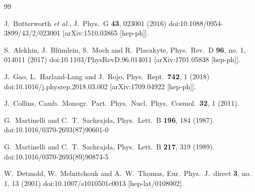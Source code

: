 %
%

\begin{thebibliography}{99}

  J.~Butterworth {\it et al.},
  J.\ Phys.\ G {\bf 43}, 023001 (2016)
  doi:10.1088/0954-3899/43/2/023001
  [arXiv:1510.03865 [hep-ph]].


  S.~Alekhin, J.~Bl\"umlein, S.~Moch and R.~Placakyte,
  Phys.\ Rev.\ D {\bf 96}, no. 1, 014011 (2017)
  doi:10.1103/PhysRevD.96.014011
  [arXiv:1701.05838 [hep-ph]].


  J.~Gao, L.~Harland-Lang and J.~Rojo,
  Phys.\ Rept.\  {\bf 742}, 1 (2018)
  doi:10.1016/j.physrep.2018.03.002
  [arXiv:1709.04922 [hep-ph]].


  J.~Collins,
  Camb.\ Monogr.\ Part.\ Phys.\ Nucl.\ Phys.\ Cosmol.\  {\bf 32}, 1 (2011).


  G.~Martinelli and C.~T.~Sachrajda,
  Phys.\ Lett.\ B {\bf 196}, 184 (1987).
  doi:10.1016/0370-2693(87)90601-0


  G.~Martinelli and C.~T.~Sachrajda,
  Phys.\ Lett.\ B {\bf 217}, 319 (1989).
  doi:10.1016/0370-2693(89)90874-5


  W.~Detmold, W.~Melnitchouk and A.~W.~Thomas,
  Eur.\ Phys.\ J.\ direct {\bf 3}, no. 1, 13 (2001)
  doi:10.1007/s1010501c0013
  [hep-lat/0108002].



\end{thebibliography}
